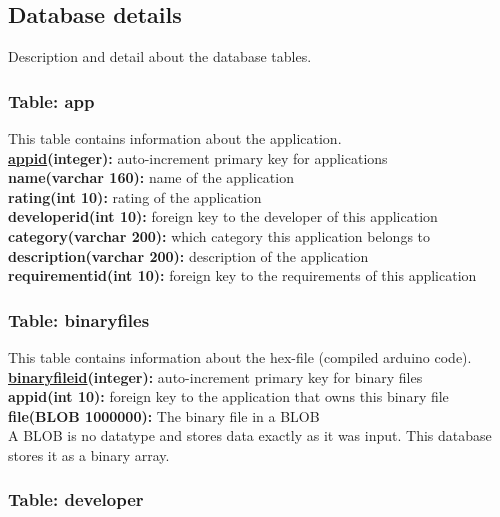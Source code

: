 	\subsection{Database details}

		Description and detail about the database tables.

		\subsubsection{Table: app}

			This table contains information about the application.\\

			{\bf \underline{appid}(integer):} auto-increment primary key for applications  \\
			\textbf{name(varchar 160):} name of the application \\
			\textbf{rating(int 10):} rating of the application \\
			\textbf{developerid(int 10):} foreign key to the developer of this application \\
			\textbf{category(varchar 200):} which category this application belongs to \\
			\textbf{description(varchar 200):} description of the application \\
			\textbf{requirementid(int 10):} foreign key to the requirements of this application \\

		\subsubsection{Table: binaryfiles}

			This table contains information about the hex-file (compiled arduino code). \\
			{\bf \underline{binaryfileid}(integer):} auto-increment primary key for binary files \\
			\textbf{appid(int 10):} foreign key to the application that owns this binary file \\
			\textbf{file(BLOB 1000000):} The binary file in a BLOB \\

			A BLOB is no datatype and stores data exactly as it was input. This database stores it as a binary array.

		\subsubsection{Table: developer}

